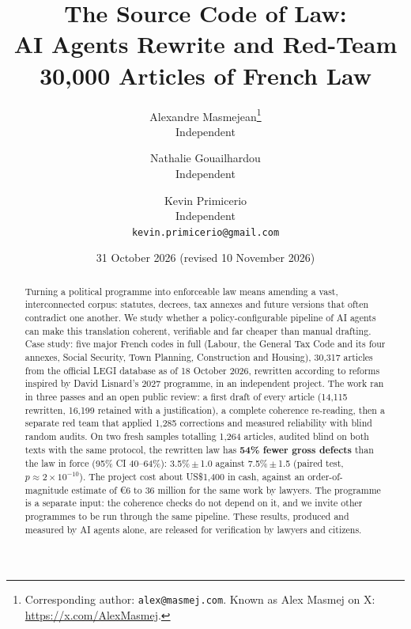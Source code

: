 \documentclass[11pt,a4paper]{article}
\title{The Source Code of Law:\\
AI Agents Rewrite and Red-Team\\
30{,}000 Articles of French Law}
\author{
  Alexandre Masmejean\thanks{Corresponding author: \texttt{alex@masmej.com}. Known as Alex Masmej on X: \url{https://x.com/AlexMasmej}.}\\
  \small Independent
  \and
  Nathalie Gouailhardou\\
  \small Independent
  \and
  Kevin Primicerio\\
  \small Independent\\
  \small\texttt{kevin.primicerio@gmail.com}
}
\date{31 October 2026 (revised 10 November 2026)}
\begin{document}
\maketitle

\begin{abstract}
Turning a political programme into enforceable law means amending a vast, interconnected corpus: statutes, decrees, tax annexes and future versions that often contradict one another. We study whether a policy-configurable pipeline of AI agents can make this translation coherent, verifiable and far cheaper than manual drafting. Case study: five major French codes in full (Labour, the General Tax Code and its four annexes, Social Security, Town Planning, Construction and Housing), 30{,}317 articles from the official LEGI database as of 18 October 2026, rewritten according to reforms inspired by David Lisnard's 2027 programme, in an independent project. The work ran in three passes and an open public review: a first draft of every article (14{,}115 rewritten, 16{,}199 retained with a justification), a complete coherence re-reading, then a separate red team that applied 1{,}285 corrections and measured reliability with blind random audits. On two fresh samples totalling 1{,}264 articles, audited blind on both texts with the same protocol, the rewritten law has \textbf{54\% fewer gross defects} than the law in force (95\% CI 40--64\%): 3.5\%\,$\pm$\,1.0 against 7.5\%\,$\pm$\,1.5 (paired test, $p \approx 2\times10^{-10}$). The project cost about US\$1{,}400 in cash, against an order-of-magnitude estimate of \euro{}6 to 36 million for the same work by lawyers. The programme is a separate input: the coherence checks do not depend on it, and we invite other programmes to be run through the same pipeline. These results, produced and measured by AI agents alone, are released for verification by lawyers and citizens.
\end{abstract}

\begin{center}
\end{center}
\end{document}
